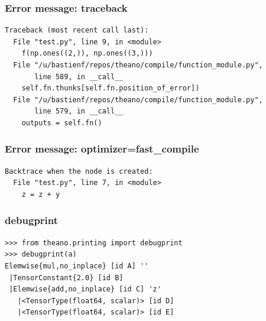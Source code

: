 \documentclass[utf8x,xcolor=pdftex,dvipsnames,table]{beamer}
\begin{document}
\begin{frame}[fragile]
  \frametitle{Error message: traceback}

\begin{lstlisting}
Traceback (most recent call last):
  File "test.py", line 9, in <module>
    f(np.ones((2,)), np.ones((3,)))
  File "/u/bastienf/repos/theano/compile/function_module.py",
       line 589, in __call__
    self.fn.thunks[self.fn.position_of_error])
  File "/u/bastienf/repos/theano/compile/function_module.py",
       line 579, in __call__
    outputs = self.fn()
\end{lstlisting}
\end{frame}


\begin{frame}[fragile]
  \frametitle{Error message: optimizer=fast\_compile}

\begin{lstlisting}
Backtrace when the node is created:
  File "test.py", line 7, in <module>
    z = z + y

\end{lstlisting}
\end{frame}


\begin{frame}[fragile]
  \frametitle{debugprint}

\begin{lstlisting}
>>> from theano.printing import debugprint
>>> debugprint(a)
Elemwise{mul,no_inplace} [id A] ''
 |TensorConstant{2.0} [id B]
 |Elemwise{add,no_inplace} [id C] 'z'
   |<TensorType(float64, scalar)> [id D]
   |<TensorType(float64, scalar)> [id E]
\end{lstlisting}
\end{frame}



\end{document}
